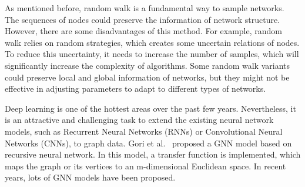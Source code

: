 As mentioned before, random walk is a fundamental way to sample networks. The sequences of nodes could preserve the information of network structure. However, there are some disadvantages of this method. For example, random walk relies on random strategies, which creates some uncertain relations of nodes. To reduce this uncertainty, it needs to increase the number of samples, which will significantly increase the complexity of algorithms. Some random walk variants could preserve local and global information of networks, but they might not be effective in adjusting parameters to adapt to different types of networks.

Deep learning is one of the hottest areas over the past few years. Nevertheless, it is an attractive and challenging task to extend the existing neural network models, such as Recurrent Neural Networks (RNNs) or Convolutional Neural Networks (CNNs), to graph data. Gori et al.~ proposed a GNN model based on recursive neural network. In this model, a transfer function is implemented, which maps the graph or its vertices to an m-dimensional Euclidean space. In recent years, lots of GNN models have been proposed.

